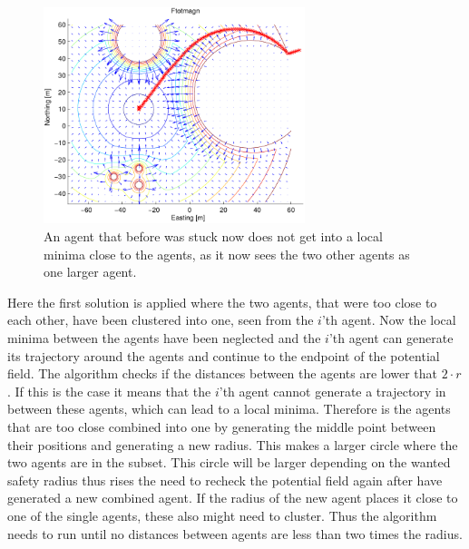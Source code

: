 \documentclass[conference]{IEEEtran}
\newcommand{\colwidth}{3in}
\begin{document}
\begin{figure}[htbp]
  \includegraphics[width=\colwidth]{fig/ftotmagnfigpdf4}
	\caption{An agent that before was stuck now does not get into a
		local minima close to the agents, as it now sees the two other
		agents as one larger agent.}
  \label{fig:solroevproblem}
\end{figure}

Here the first solution is applied where the two agents, that were too
close to each other, have been clustered into one, seen from the
$i$'th agent. Now the local minima between the agents have been
neglected and the $i$'th agent can generate its trajectory around the
agents and continue to the endpoint of the potential field. The
algorithm checks if the distances between the agents are lower that $2
\cdot r$. If this is the case it means that the $i$'th agent cannot
generate a trajectory in between these agents, which can lead to a
local minima. Therefore is the agents that are too close combined into
one by generating the middle point between their positions and
generating a new radius. This makes a larger circle where the two
agents are in the subset. This circle will be larger depending on the
wanted safety radius thus rises the need to recheck the potential
field again after have generated a new combined agent. If the radius
of the new agent places it close to one of the single agents, these
also might need to cluster. Thus the algorithm needs to run until no
distances between agents are less than two times the radius.
\end{document}

